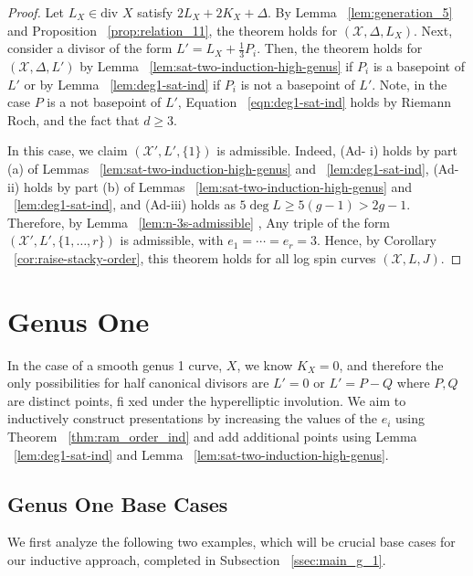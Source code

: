 \documentclass{amsart}
\theoremstyle{plain}
\theoremstyle{definition}
\theoremstyle{remark}
\numberwithin{equation}{section}
\newcommand\ssec{\subsection}
\newcommand \sx{\mathscr X}
\newcommand \di{\text{div }}
\newcommand \halfcan{L}
\begin{document}
\begin{proof}
Let $\halfcan_X \in \di X$ satisfy $2\halfcan_X + 2 K_X + \Delta$.
By Lemma ~\ref{lem:generation_5} and Proposition
~\ref{prop:relation_11}, the theorem holds for $(\sx, \Delta,
\halfcan_X)$. Next, consider a divisor of the form $\halfcan' =
\halfcan_X + \frac{1}{3} P_i$. Then, the theorem holds for $(\sx,
\Delta, \halfcan')$ by Lemma ~\ref{lem:sat-two-induction-high-genus}
 if $P_i$ is a basepoint of $\halfcan'$ or by Lemma
~\ref{lem:deg1-sat-ind} if $P_i $ is not a basepoint of $L'$. Note,
in the case $P$  is a not basepoint of $\halfcan'$, Equation
~\ref{eqn:deg1-sat-ind} holds by Riemann Roch, and the fact that $d
\geq 3$.

In this case, we claim $(\sx',L',\{1\})$ is admissible. Indeed, (Ad-
i) holds by part (a) of Lemmas
~\ref{lem:sat-two-induction-high-genus} and ~\ref{lem:deg1-sat-ind},
(Ad-ii) holds by part (b) of Lemmas
~\ref{lem:sat-two-induction-high-genus} and ~\ref{lem:deg1-sat-ind},
and (Ad-iii) holds as $5\deg L \geq 5(g-1)> 2g-1.$ Therefore, by
Lemma ~\ref{lem:n-3s-admissible} , Any triple of the form $(\sx', L',
\{1,\ldots, r\})$ is admissible, with $e_1 = \cdots = e_r = 3$.
Hence, by Corollary ~\ref{cor:raise-stacky-order}, this theorem 
holds for all log spin curves $(\sx, L, J)$. 
\end{proof}


\section{Genus One}
\label{sec:g_1}

In the case of a smooth genus 1 curve, $X$, we know $K_X = 0$, and therefore the only possibilities for half canonical divisors are $\halfcan' = 0$ or $\halfcan' = P - Q$ where $P,Q$ are distinct points, fi xed under the hyperelliptic involution. We aim to inductively construct presentations by increasing the values of the $e_i$ using Theorem ~\ref{thm:ram_order_ind} and add additional points using Lemma ~\ref{lem:deg1-sat-ind} and Lemma ~\ref{lem:sat-two-induction-high-genus}.

\ssec{Genus One Base Cases}
\label{ssec:g_1_base}

We first analyze the following two examples, which will be crucial base cases for our inductive approach, completed in Subsection ~\ref{ssec:main_g_1}.
\end{document}
